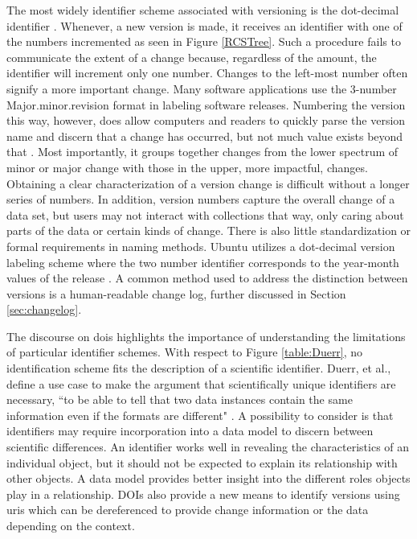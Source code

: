 The most widely identifier scheme associated with versioning is the dot-decimal identifier \cite{Stuckenholz:2005:CEV:1039174.1039197}.
Whenever, a new version is made, it receives an identifier with one of the numbers incremented as seen in Figure \ref{RCSTree}.
Such a procedure fails to communicate the extent of a change because, regardless of the amount, the identifier will increment only one number.
Changes to the left-most number often signify a more important change.
Many software applications use the 3-number Major.minor.revision format in labeling software releases.
Numbering the version this way, however, does allow computers and readers to quickly parse the version name and discern that a change has occurred, but not much value exists beyond that \cite{Dijkstra1994}.
Most importantly, it groups together changes from the lower spectrum of minor or major change with those in the upper, more impactful, changes.
Obtaining a clear characterization of a version change is difficult without a longer series of numbers.
In addition, version numbers capture the overall change of a data set, but users may not interact with collections that way, only caring about parts of the data or certain kinds of change.
There is also little standardization or formal requirements in naming methods.
Ubuntu utilizes a dot-decimal version labeling scheme where the two number identifier corresponds to the year-month values of the release \cite{Ubuntu}.
A common method used to address the distinction between versions is a human-readable change log, further discussed in Section \ref{sec:changelog}.

The discourse on \glspl{doi} highlights the importance of understanding the limitations of particular identifier schemes.
With respect to Figure \ref{table:Duerr}, no identification scheme fits the description of a scientific identifier.
Duerr, et al., define a use case to make the argument that scientifically unique identifiers are necessary, ``to be able to tell that two data instances contain the same information even if the formats are different" \cite{Duerr2011}.
A possibility to consider is that identifiers may require incorporation into a data model to discern between scientific differences.
An identifier works well in revealing the characteristics of an individual object, but it should not be expected to explain its relationship with other objects.
A data model provides better insight into the different roles objects play in a relationship.
DOIs also provide a new means to identify versions using \glspl{uri} which can be dereferenced to provide change information or the data depending on the context.

